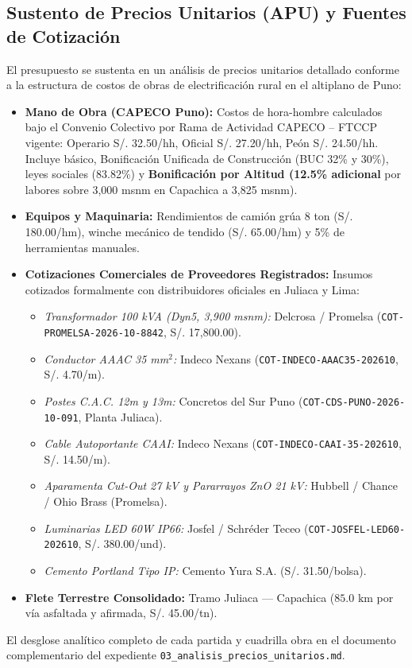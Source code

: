 \documentclass[12pt,a4paper]{report}
\begin{document}
\subsection{Sustento de Precios Unitarios (APU) y Fuentes de Cotización}
El presupuesto se sustenta en un análisis de precios unitarios detallado conforme a la estructura de costos de obras de electrificación rural en el altiplano de Puno:
\begin{itemize}
    \item \textbf{Mano de Obra (CAPECO Puno):} Costos de hora-hombre calculados bajo el Convenio Colectivo por Rama de Actividad CAPECO -- FTCCP vigente: Operario S/. 32.50/hh, Oficial S/. 27.20/hh, Peón S/. 24.50/hh. Incluye básico, Bonificación Unificada de Construcción (BUC 32\% y 30\%), leyes sociales (83.82\%) y \textbf{Bonificación por Altitud (12.5\% adicional} por labores sobre 3,000 msnm en Capachica a 3,825 msnm).
    \item \textbf{Equipos y Maquinaria:} Rendimientos de camión grúa 8 ton (S/. 180.00/hm), winche mecánico de tendido (S/. 65.00/hm) y 5\% de herramientas manuales.
    \item \textbf{Cotizaciones Comerciales de Proveedores Registrados:} Insumos cotizados formalmente con distribuidores oficiales en Juliaca y Lima:
    \begin{itemize}
        \item \textit{Transformador 100 kVA (Dyn5, 3,900 msnm):} Delcrosa / Promelsa (\texttt{COT-PROMELSA-2026-10-8842}, S/. 17,800.00).
        \item \textit{Conductor AAAC 35 mm$^2$:} Indeco Nexans (\texttt{COT-INDECO-AAAC35-202610}, S/. 4.70/m).
        \item \textit{Postes C.A.C. 12m y 13m:} Concretos del Sur Puno (\texttt{COT-CDS-PUNO-2026-10-091}, Planta Juliaca).
        \item \textit{Cable Autoportante CAAI:} Indeco Nexans (\texttt{COT-INDECO-CAAI-35-202610}, S/. 14.50/m).
        \item \textit{Aparamenta Cut-Out 27 kV y Pararrayos ZnO 21 kV:} Hubbell / Chance / Ohio Brass (Promelsa).
        \item \textit{Luminarias LED 60W IP66:} Josfel / Schréder Teceo (\texttt{COT-JOSFEL-LED60-202610}, S/. 380.00/und).
        \item \textit{Cemento Portland Tipo IP:} Cemento Yura S.A. (S/. 31.50/bolsa).
    \end{itemize}
    \item \textbf{Flete Terrestre Consolidado:} Tramo Juliaca --- Capachica ($85.0\text{ km}$ por vía asfaltada y afirmada, S/. 45.00/tn).
\end{itemize}
El desglose analítico completo de cada partida y cuadrilla obra en el documento complementario del expediente \texttt{03\_analisis\_precios\_unitarios.md}.
\end{document}
